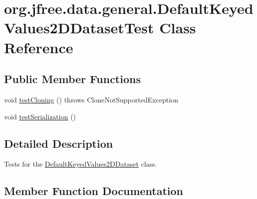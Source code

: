 \hypertarget{classorg_1_1jfree_1_1data_1_1general_1_1_default_keyed_values2_d_dataset_test}{}\section{org.\+jfree.\+data.\+general.\+Default\+Keyed\+Values2\+D\+Dataset\+Test Class Reference}
\label{classorg_1_1jfree_1_1data_1_1general_1_1_default_keyed_values2_d_dataset_test}
\subsection*{Public Member Functions}
\begin{DoxyCompactItemize}
\item 
void \mbox{\hyperlink{classorg_1_1jfree_1_1data_1_1general_1_1_default_keyed_values2_d_dataset_test_a75dbb4461529ce73d6663f533c4ac428}{test\+Cloning}} ()  throws Clone\+Not\+Supported\+Exception 
\item 
void \mbox{\hyperlink{classorg_1_1jfree_1_1data_1_1general_1_1_default_keyed_values2_d_dataset_test_a395aeb07712ae4fe1f9c4fd967bb896d}{test\+Serialization}} ()
\end{DoxyCompactItemize}


\subsection{Detailed Description}
Tests for the \mbox{\hyperlink{classorg_1_1jfree_1_1data_1_1general_1_1_default_keyed_values2_d_dataset}{Default\+Keyed\+Values2\+D\+Dataset}} class. 

\subsection{Member Function Documentation}
\mbox{\label{classorg_1_1jfree_1_1data_1_1general_1_1_default_keyed_values2_d_dataset_test_a75dbb4461529ce73d6663f533c4ac428}} 
